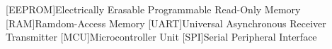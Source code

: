 \begin{acronym}[xxxxxxxxx]
  [EEPROM]{Electrically Erasable Programmable Read-Only Memory}
  [RAM]{Ramdom-Access Memory}
  [UART]{Universal Asynchronous Receiver Transmitter}
  [MCU]{Microcontroller Unit}
  [SPI]{Serial Peripheral Interface}
  
\end{acronym}

